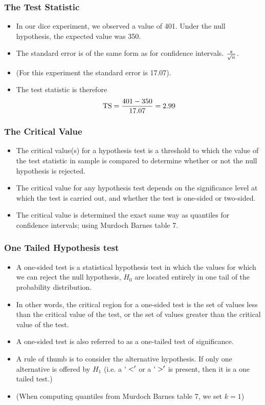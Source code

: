 ﻿\documentclass[a4]{beamer}
\begin{document}
\begin{frame}
\frametitle{The Test Statistic}
\begin{itemize}

\item In our dice experiment, we observed a value of 401. Under the null hypothesis, the expected value was 350.
\item The standard error is of the same form as for confidence intervals. $s \over \sqrt{n}$.
\item (For this experiment the standard error is 17.07).
\item The test statistic is therefore \[ \mbox{TS}  = {401 - 350  \over 17.07} = 2.99 \]
\end{itemize}
\end{frame}



\begin{frame}
\frametitle{The Critical Value}


\begin{itemize}
\item The critical value(s) for a hypothesis test is a threshold to which the value of the test statistic in sample is compared to determine whether or not the null hypothesis is rejected.
\item The critical value for any hypothesis test depends on the significance level at which the test is carried out, and whether the test is one-sided or two-sided.
\item The critical value is determined the exact same way as quantiles for confidence intervals; using Murdoch Barnes table 7.


\end{itemize}
\end{frame}



\begin{frame}
\frametitle{One Tailed Hypothesis test}
\begin{itemize}
\item A one-sided test is a statistical hypothesis test in which the values for which we can reject the null hypothesis, $H_0$ are located entirely in one tail of the probability distribution.

\item In other words, the critical region for a one-sided test is the set of values less than the critical value of the test, or the set of values greater than the critical value of the test.

\item A one-sided test is also referred to as a one-tailed test of significance.

\item A rule of thumb is to consider the alternative hypothesis.  If only one alternative is offered by $H_1$ (i.e. a $`<'$ or a $`>'$ is present, then it is a one tailed test.)
\item (When computing quantiles from Murdoch Barnes table 7, we set $k=1$)
\end{itemize}
\end{frame}
\end{document}

